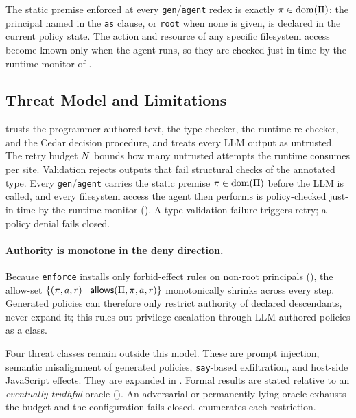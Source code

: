 The static premise enforced at every \texttt{gen}/\texttt{agent} redex
is exactly $\pi \in \mathrm{dom}(\Pi)$: the principal named in the
\texttt{as} clause, or \texttt{root} when none is given, is declared in
the current policy state. The action and resource of any specific
filesystem access become known only when the agent runs, so they are
checked just-in-time by the runtime monitor of
.

\subsection{Threat Model and Limitations}
\label{sec:design-threat}

\pact{} trusts the programmer-authored text, the type checker, the
runtime re-checker, and the Cedar decision procedure, and treats every
LLM output as untrusted. The retry budget $N$ bounds how many
untrusted attempts the runtime consumes per site. Validation rejects
outputs that fail structural checks of the annotated type. Every
\texttt{gen}/\texttt{agent} carries the static premise
$\pi \in \mathrm{dom}(\Pi)$ before the LLM is called, and every
filesystem access the agent then performs is policy-checked
just-in-time by the runtime monitor ().
A type-validation failure triggers retry; a policy denial fails closed.

\paragraph{Authority is monotone in the deny direction.} Because
\texttt{enforce} installs only forbid-effect rules on non-root
principals (), the allow-set
$\{(\pi, a, r) \mid \mathsf{allows}(\Pi, \pi, a, r)\}$
monotonically shrinks across every step. Generated policies can
therefore only restrict authority of declared descendants, never
expand it; this rules out privilege escalation through LLM-authored
policies as a class.

\label{sec:design-limitations}
Four threat classes remain outside this model.
These are prompt injection, semantic misalignment of generated policies,
\texttt{say}-based exfiltration, and host-side JavaScript effects.
They are expanded in . Formal results are stated
relative to an \emph{eventually-truthful} oracle
(). An adversarial or permanently lying oracle
exhausts the budget and the configuration fails closed.
 enumerates each restriction.
